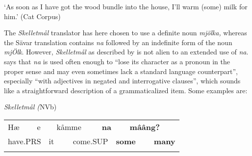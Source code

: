 \begin{styleTranslation}
‘As soon as I have got the wood bundle into the house, I’ll warm (some) milk for him.’ (Cat Corpus)

\end{styleTranslation}

\begin{styleBodyTextFirst}
The \textit{Skelletmål} translator has here chosen to use a definite noun \textit{mjölka, }whereas the Sävar translation contains \textit{na }followed by an indefinite form of the noun \textit{mjÖlk}. However, \textit{Skelletmål} as described by \citet{Marklund1976} is not alien to an extended use of \textit{na}. \citet[43]{Marklund1976} says that \textit{na} is used often enough to “lose its character as a pronoun in the proper sense and may even sometimes lack a standard language counterpart”, especially “with adjectives in negated and interrogative clauses”, which sounds like a straightforward description of a grammaticalized item. Some examples are:

\end{styleBodyTextFirst}

\begin{listWWNumileveli}
\item 

\begin{styleExample}
\textit{Skelletmål (}NVb)

\end{styleExample}

\end{listWWNumileveli}

\begin{tabular}{llllllllll}
\lsptoprule
Hæ & \multicolumn{2}{l}{e

} & \multicolumn{2}{l}{kåmme

} & \multicolumn{2}{l}{{\bfseries na}

} & \multicolumn{2}{l}{{\bfseries mââng?}

} & \\
\multicolumn{2}{l}{have.PRS

} & \multicolumn{2}{l}{it

} & \multicolumn{2}{l}{come.SUP

} & \multicolumn{2}{l}{{\bfseries some}

} & \multicolumn{2}{l}{{\bfseries many}

}\\
\lspbottomrule
\end{tabular}

